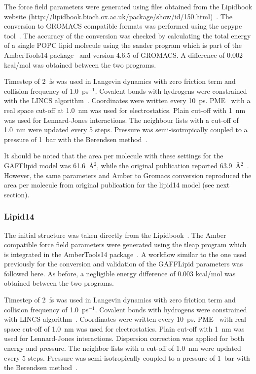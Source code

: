 \documentclass[journal=jacsat,manuscript=article]{achemso}
\begin{document}
The force field parameters were generated using files obtained from the Lipidbook website (\url{http://lipidbook.bioch.ox.ac.uk/package/show/id/150.html})~\cite{domanski10}. 
The conversion to GROMACS compatible formats was performed using the acpype tool~\cite{silva12}. The accuracy of the conversion was checked by calculating 
the total energy of a single POPC lipid molecule using the sander program which is part of the AmberTools14 package~\cite{ferrer13} and version 4.6.5 of GROMACS. 
A difference of 0.002 kcal/mol was obtained between the two programs.

Timestep of 2~fs was used in Langevin dynamics with zero friction term and collision frequency of 1.0~ps$^{-1}$. 
Covalent bonds with hydrogens were constrained with the LINCS algorithm~\cite{hess97,hess07}.
Coordinates were written every 10~ps. PME~\cite{darden93,essman95} with a real space cut-off at 1.0~nm was used 
for electrostatics. Plain cut-off with 1~nm was used for Lennard-Jones interactions. 
The neighbour lists with a cut-off of 1.0~nm were updated every 5 steps. 
Pressure was semi-isotropically coupled to a pressure of 1~bar with the Berendsen method~\cite{berendsen84}.

It should be noted that the area per molecule with these settings for the GAFFlipid model was 61.6~\AA$^2$,
while the original publication reported 63.9~\AA$^2$~\cite{dickson12}. However, the same parameters and Amber to Gromacs
conversion reproduced the area per molecule from original publication for the lipid14 model (see next section).

\subsubsection{Lipid14}
The initial structure was taken directly from the Lipidbook~\cite{domanski10}.
The Amber compatible force field parameters were generated using the tleap program which is integrated in the AmberTools14 package~\cite{ferrer13}. 
A workflow similar to the one used previously for the conversion and validation of the GAFFLipid parameters was followed here. 
As before, a negligible energy difference of 0.003 kcal/mol was obtained between the two programs.

Timestep of 2~fs was used in Langevin dynamics with zero friction term and collision frequency of 1.0~ps$^{-1}$. 
Covalent bonds with hydrogens were constrained with LINCS algorithm~\cite{hess97,hess07}.
Coordinates were written every 10~ps. PME~\cite{darden93,essman95} with real space cut-off of 1.0~nm was used 
for electrostatics. Plain cut-off with 1~nm was used for Lennard-Jones interactions. Dispersion correction
was applied for both energy and pressure. The neighbor lists with a cut-off of 1.0~nm were updated every 5 steps. 
Pressure was semi-isotropically coupled to a pressure of 1~bar with the Berendsen method~\cite{berendsen84}.
\end{document}
